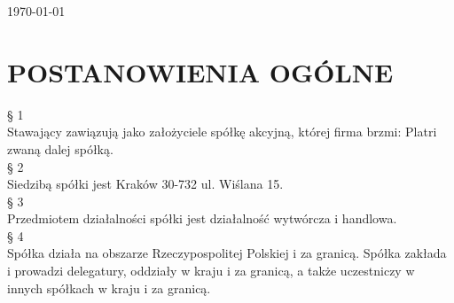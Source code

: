 \documentclass[a4paper, 11pt]{article}
\begin{document}
\begin{titlepage}
		
		
		{\large \today}\\[3cm] %
		
		
		
		
		\vfill %
		
	\end{titlepage}
	
	
	\tableofcontents
	\vfill


\section{POSTANOWIENIA OGÓLNE} 

§ 1\\

Stawający zawiązują jako założyciele spółkę akcyjną, której firma brzmi: Platri zwaną dalej spółką.\\ 

§ 2\\

Siedzibą spółki jest  Kraków 30-732 ul. Wiślana 15.\\ 

§ 3\\

Przedmiotem działalności spółki jest działalność wytwórcza i handlowa.\\ 

§ 4\\

Spółka działa na obszarze Rzeczypospolitej Polskiej i za granicą. Spółka zakłada i prowadzi delegatury, oddziały w kraju i za granicą, a także uczestniczy w innych spółkach w kraju i za granicą.\\ 
\end{document}
